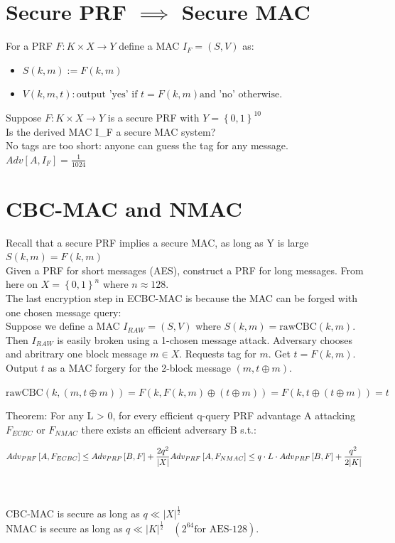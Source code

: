 \documentclass[a4paper]{article}
\begin{document}
	\section{Secure PRF $\implies$ Secure MAC}
	For a PRF $F: K \times X \to Y$ define a MAC $I_F=\left( S,V \right) $ as:\\
	\begin{itemize}
		\item $S\left( k,m \right) := F\left( k,m \right) $
		\item $V\left( k, m, t \right): \text{output 'yes' if } t = F\left( k,m \right) \text{and 'no' otherwise.}$
	\end{itemize}
	Suppose $F:K \times  X \to Y$ is a secure PRF with $Y = \left\{ 0,1 \right\}^{10} $ \\
	Is the derived MAC I_F a secure MAC system?\\
	No tags are too short: anyone can guess the tag for any message. $Adv\left[ A,I_F \right] = \frac{1}{1024}$ 
	
	\section{CBC-MAC and NMAC}
	Recall that a secure PRF implies a secure MAC, as long as Y is large $S\left( k,m \right) = F\left( k,m \right) $ \\
	Given a PRF for short messages (AES), construct a PRF for long messages. From here on $X = \left\{ 0,1 \right\}^{n} $ where $n \approx 128$.\\
	The last encryption step in ECBC-MAC is because the MAC can be forged with one chosen message query:\\
	Suppose we define a MAC $I_{RAW} = \left( S,V \right) $ where 
	$S\left( k,m \right) = \text{rawCBC}\left( k,m \right) $. Then $I_{RAW}$ is easily broken 
	using a 1-chosen message attack. Adversary chooses and abritrary one block message $m \in X$.
	Requests tag for $m$. Get $t = F\left( k,m \right) $. Output $t$ as a MAC forgery for the 2-block
	message $\left( m, t \oplus m \right) $.
	\begin{center}
		$\text{rawCBC}\left( k,\left( m,t \oplus m \right)  \right) = F\left( k, F\left( k,m \right) \oplus \left( t\oplus m \right)  \right) = F\left( k,t \oplus \left( t \oplus m \right)  \right)  = t$
	\end{center}

	Theorem: For any L > 0, for every efficient q-query PRF advantage A attacking $F_{ECBC}$ or $F_{NMAC}$
	there exists an efficient adversary B s.t.:
	\begin{center}
		\[ Adv_{PRF}\left[ A, F_{ECBC} \right] \le Adv_{PRP}\left[ B, F \right] + \frac{2q^2}{|X|}\\
			Adv_{PRF}\left[ A, F_{NMAC} \right] \le  q \cdot L \cdot Adv_{PRF}\left[ B, F \right] + \frac{q^2}{2|K|} \] 
	\end{center}
	\\
	\\
	CBC-MAC is secure as long as $q \ll |X|^{\frac{1}{2}}$ \\
	NMAC is secure as long as $q \ll |K|^{\frac{1}{2}}\ \ \ \ \left( 2^{64}\text{for AES-128} \right)$.
\end{document}

